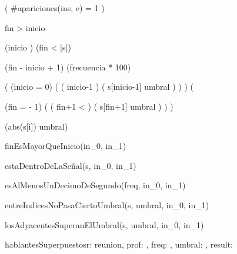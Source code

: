 \documentclass{article}
\begin{document}
    {
        \implicaLuego (
            \#apariciones(ins, e) = 1
        )
    }
    
    {
        fin > inicio
    }
    
    {
        (inicio ) \wedge (fin < |s|)
    }
    
    {
        (fin - inicio + 1) \geq (frecuencia * 100)
    }
    
    {
    
        (
            (inicio = 0) \oLuego (
                (
                    inicio-1  
                ) \yLuego (
                    s[inicio-1] \geq umbral
                )
            )
        ) \wedge (
    
            (fin =  - 1) \oLuego (
                (
                    fin+1 < 
                ) \yLuego (
                    s[fin+1] \geq umbral
                )
            )
        )
    }
    
    {
    
        \implicaLuego
        (abs(s[i]) \leq umbral)
    }
    
    {
    
        finEsMayorQueInicio(in_{0}, in_{1}) \yLuego
    
        estaDentroDeLaSeñal(s, in_{0}, in_{1}) \yLuego
    
        esAlMenosUnDecimoDeSegundo(freq, in_{0}, in_{1}) \yLuego
    
        entreIndicesNoPasaCiertoUmbral(s, umbral, in_{0}, in_{1}) \yLuego
    
        losAdyacentesSuperanElUmbral(s, umbral, in_{0}, in_{1})
    }
    

    \begin{proc}{hablantesSuperpuestos}{\In r: reunion,
        \In prof: \ent,
        \In freq: \ent,
        \In umbral: \ent,
        \Out result: \bool}{}
    \end{proc}
    
\end{document}
